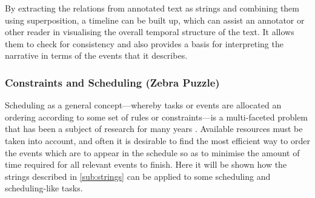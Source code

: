 \documentclass[a4paper,12pt,leqno]{article}
\begin{document}
By extracting the relations from annotated text as strings and combining them using superposition, a timeline can be built up, which can assist an annotator or other reader in visualising the overall temporal structure of the text. It allows them to check for consistency and also provides a basis for interpreting the narrative in terms of the events that it describes.



\subsubsection{Constraints and Scheduling (Zebra Puzzle)}\label{ssub:zebra}
Scheduling as a general concept---whereby tasks or events are allocated an ordering according to some set of rules or constraints---is a multi-faceted problem that has been a subject of research for many years \citep{manne1960job,applegate1991computational,pinedo1992scheduling,gong2018memetic}. Available resources must be taken into account, and often it is desirable to find the most efficient way to order the events which are to appear in the schedule so as to minimise the amount of time required for all relevant events to finish. Here it will be shown how the strings described in \cref{sub:strings} can be applied to some scheduling and scheduling-like tasks.
\end{document}
